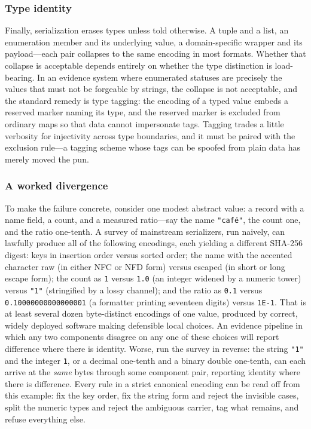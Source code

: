 \subsubsection{Type identity}\label{ch02:canon-types}

Finally, serialization erases types unless told otherwise. A tuple
and a list, an enumeration member and its underlying value, a
domain-specific wrapper and its payload---each pair collapses to the
same encoding in most formats. Whether that collapse is acceptable
depends entirely on whether the type distinction is load-bearing. In
an evidence system where enumerated statuses are precisely the values
that must not be forgeable by strings, the collapse is not
acceptable, and the standard remedy is type tagging: the encoding of
a typed value embeds a reserved marker naming its type, and the
reserved marker is excluded from ordinary maps so that data cannot
impersonate tags. Tagging trades a little verbosity for injectivity
across type boundaries, and it must be paired with the exclusion
rule---a tagging scheme whose tags can be spoofed from plain data
has merely moved the pun.

\subsubsection{A worked divergence}\label{ch02:canon-worked}

To make the failure concrete, consider one modest abstract value: a
record with a name field, a count, and a measured ratio---say the
name \texttt{"caf\'e"}, the count one, and the ratio one-tenth. A
survey of mainstream serializers, run naively, can lawfully produce
all of the following encodings, each yielding a different SHA-256
digest: keys in insertion order versus sorted order; the name with
the accented character raw (in either NFC or NFD form) versus
escaped (in short or long escape form); the count as \texttt{1}
versus \texttt{1.0} (an integer widened by a numeric tower) versus
\texttt{"1"} (stringified by a lossy channel); and the ratio as
\texttt{0.1} versus \texttt{0.10000000000000001} (a formatter
printing seventeen digits) versus \texttt{1E-1}. That is at least
several dozen byte-distinct encodings of one value, produced by
correct, widely deployed software making defensible local choices.
An evidence pipeline in which any two components disagree on any one
of these choices will report difference where there is identity.
Worse, run the survey in reverse: the string \texttt{"1"} and the
integer \texttt{1}, or a decimal one-tenth and a binary
double one-tenth, can each arrive at the \emph{same} bytes through
some component pair, reporting identity where there is difference.
Every rule in a strict canonical encoding can be read off from this
example: fix the key order, fix the string form and reject the
invisible cases, split the numeric types and reject the ambiguous
carrier, tag what remains, and refuse everything else.

